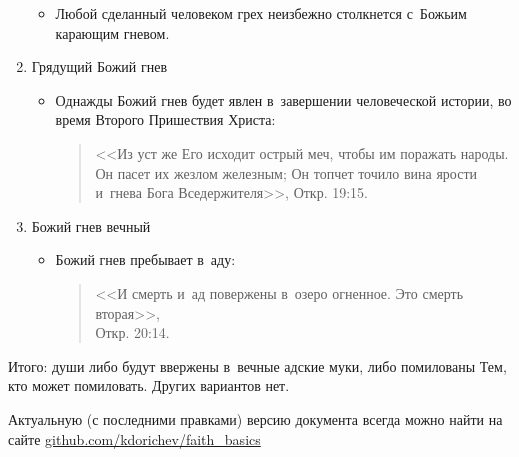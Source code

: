 \documentclass[a4paper,12pt]{article}
\begin{document}
\begin{enumerate}
\begin{itemize}
\begin{quote}
        \end{quote}
        \item Любой сделанный человеком грех неизбежно столкнется с~Божьим карающим гневом.
    \end{itemize}
    \item Грядущий Божий гнев 
    \begin{itemize}
        \item Однажды Божий гнев будет явлен в~завершении человеческой истории, во время Второго Пришествия Христа:
        \begin{quote}
        <<Из уст же Его исходит острый меч, чтобы им поражать народы. Он пасет их жезлом железным; Он топчет точило вина ярости и~гнева Бога Вседержителя>>, Откр. 19:15. 
        \end{quote}  
    \end{itemize}
    \item Божий гнев вечный 
    \begin{itemize}
        \item Божий гнев пребывает в~аду:
        \begin{quote}
        <<И смерть и~ад повержены в~озеро огненное. Это смерть вторая>>,\\ Откр. 20:14.
        \end{quote}
    \end{itemize}
\end{enumerate}

\noindent Итого: души либо будут ввержены в~вечные адские муки, либо помилованы Тем, кто может помиловать. Других вариантов нет.

\vfill
\tiny{Актуальную (с последними правками) версию документа всегда можно найти на сайте \href{https://github.com/kdorichev/faith_basics/blob/main/God/lesson_3.4.pdf}{github.com/kdorichev/faith\_basics}}
\end{document}
